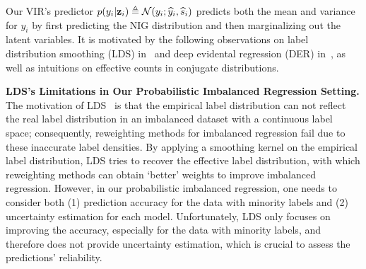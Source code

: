 

Our VIR's predictor $p(y_i|{\bf z}_i)\triangleq{\mathcal N}(y_i;\widehat{y}_i,\widehat{s}_i)$ predicts both the mean and variance for $y_i$ by first predicting the NIG distribution and then marginalizing out the latent variables. 
It is motivated by the following observations on label distribution smoothing (LDS) in~\citep{DIR} and deep evidental regression (DER) in~\citep{DER}, as well as intuitions on effective counts in conjugate distributions. 

\textbf{LDS's Limitations in Our Probabilistic Imbalanced Regression Setting.} The motivation of LDS~\citep{DIR} is that the empirical label distribution can not reflect the real label distribution in an imbalanced dataset with a continuous label space;
consequently, reweighting methods for imbalanced regression fail due to these inaccurate label densities.
By applying a smoothing kernel on the empirical label distribution, LDS tries to recover the effective label distribution, with which reweighting methods can obtain `better' weights to improve imbalanced regression. 
However, in our probabilistic imbalanced regression, one needs to consider both (1) prediction accuracy for the data with minority labels and (2) uncertainty estimation for each model. Unfortunately, LDS only focuses on improving the accuracy, especially for the data with minority labels, and therefore does not provide uncertainty estimation, which is crucial to assess the predictions' reliability.

